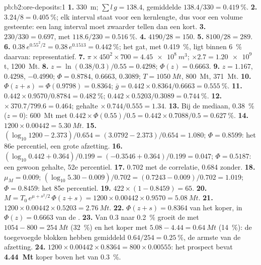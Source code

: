 \begin{solution}{pb:b2:ore-deposits:1}
\textbf{1.} \qty{330}{m}; $\sum l\,g = 138.4$, gemiddelde $138.4/330 = \qty{0.419}{\percent}$.
\textbf{2.} $3.24/8 = \qty{0.405}{\percent}$; elk interval staat voor een kernlengte, dus voor een
volume gesteente: een lang interval moet zwaarder tellen dan een kort.
\textbf{3.} $230/330 = 0.697$, met $118.6/230 = \qty{0.516}{\percent}$.
\textbf{4.} $4190/28 = 150$.
\textbf{5.} $8100/28 = 289$.
\textbf{6.} $0.38\,e^{0.55^2/2} = 0.38\,e^{0.1513} = \qty{0.442}{\percent}$; het gat, met
\qty{0.419}{\percent}, ligt binnen \qty{6}{\percent} daarvan: representatief.
\textbf{7.} $\pi \times 450^2 \times 700 = \qty{4.45e8}{m^3}$; $\times 2.7 = \num{1.20e9}$ t,
\qty{1200}{Mt}.
\textbf{8.} $z = \ln(0.38/0.3)/0.55 = 0.4298$; $\Phi(z) = 0.6663$.
\textbf{9.} $z = 1.167$, 0.4298, $-0.4990$; $\Phi = 0.8784$, 0.6663, 0.3089; $T = \qty{1050}{Mt}$,
\qty{800}{Mt}, \qty{371}{Mt}.
\textbf{10.} $\Phi(z + s) = \Phi(0.9798) = 0.8364$; $\bar g = 0.442 \times 0.8364/0.6663 =
\qty{0.555}{\percent}$.
\textbf{11.} $0.442 \times 0.9570/0.8784 = \qty{0.482}{\percent}$; $0.442 \times 0.5203/0.3089 =
\qty{0.744}{\percent}$.
\textbf{12.}  $\times\, 370.7/799.6 = 0.464$; gehalte $\times\, 0.744/0.555 = 1.34$.
\textbf{13.} Bij de mediaan, \qty{0.38}{\percent} ($z = 0$): \qty{600}{Mt} met $0.442 \times
\Phi(0.55)/0.5 = 0.442 \times 0.7088/0.5 = \qty{0.627}{\percent}$.
\textbf{14.} $1200 \times 0.00442 = \qty{5.30}{Mt}$.
\textbf{15.} $(\log_{10} 1200 - 2.373)/0.654 = (3.0792 - 2.373)/0.654 = 1.080$; $\Phi = 0.8599$: het
86e percentiel, een grote afzetting.
\textbf{16.} $(\log_{10} 0.442 + 0.364)/0.199 = (-0.3546 + 0.364)/0.199 = 0.047$; $\Phi = 0.5187$: een
gewoon gehalte, 52e percentiel.
\textbf{17.} 0.702 met de correlatie, 0.684 zonder.
\textbf{18.} $\mu_M = 0.009$; $(\log_{10} 5.30 - 0.009)/0.702 = (0.7243 - 0.009)/0.702 = 1.019$; $\Phi =
0.8459$: het 85e percentiel.
\textbf{19.} $422 \times (1 - 0.8459) = 65$.
\textbf{20.} $M = T_0\,e^{\mu + s^2/2}\,\Phi(z + s) = 1200 \times 0.00442 \times 0.9570 =
\qty{5.08}{Mt}$.
\textbf{21.} $1200 \times 0.00442 \times 0.5203 = \qty{2.76}{Mt}$.
\textbf{22.} $\Phi(z + s) = 0.8364$ van het koper, in $\Phi(z) = 0.6663$ van de .
\textbf{23.} Van 0.3 naar \qty{0.2}{\percent} groeit de  met $1054 - 800 = \qty{254}{Mt}$
(\qty{32}{\percent}) en het koper met $5.08 - 4.44 = \qty{0.64}{Mt}$ (\qty{14}{\percent}): de toegevoegde
blokken hebben gemiddeld $0.64/254 = \qty{0.25}{\percent}$, de armste van de afzetting.
\textbf{24.} $1200 \times 0.00442 \times 0.8364 = 800 \times 0.00555$: het prospect bevat
\textbf{\qty[text-series-to-math=true]{4.44}{Mt}} koper boven het  van \qty{0.3}{\percent}.
\end{solution}
